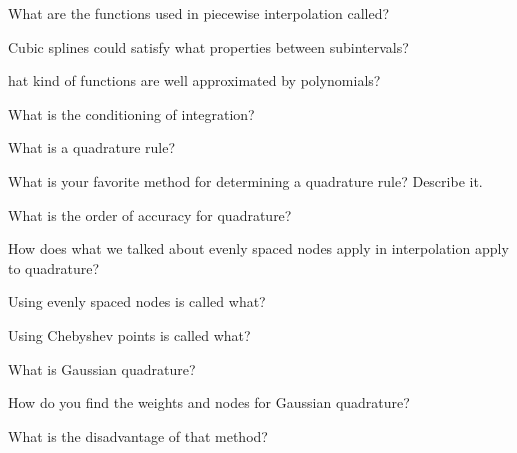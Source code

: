 \documentclass[12pt]{article}
\newenvironment{problem}[2][Problem]{\begin{trivlist}
\item[\hskip \labelsep {\bfseries #1}\hskip \labelsep {\bfseries #2.}]}{\end{trivlist}}
\begin{document}
\begin{problem}{}
What are the functions used in piecewise interpolation called?
\end{problem}

\begin{problem}{}
Cubic splines could satisfy what properties between subintervals?
\end{problem}

\begin{problem}
What kind of functions are well approximated by polynomials?
\end{problem}

\begin{problem}{}
What is the conditioning of integration?
\end{problem}

\begin{problem}{}
What is a quadrature rule?
\end{problem}

\begin{problem}{}
What is your favorite method for determining a quadrature rule?  Describe it.
\end{problem}

\begin{problem}{}
What is the order of accuracy for quadrature?
\end{problem}

\begin{problem}{}
How does what we talked about evenly spaced nodes apply in interpolation apply to quadrature?
\end{problem}

\begin{problem}{}
Using evenly spaced nodes is called what?
\end{problem}

\begin{problem}{}
Using Chebyshev points is called what?
\end{problem}

\begin{problem}{}
What is Gaussian quadrature?
\end{problem}

\begin{problem}{}
How do you find the weights and nodes for Gaussian quadrature?
\end{problem}

\begin{problem}{}
What is the disadvantage of that method?
\end{problem}
\end{document}
